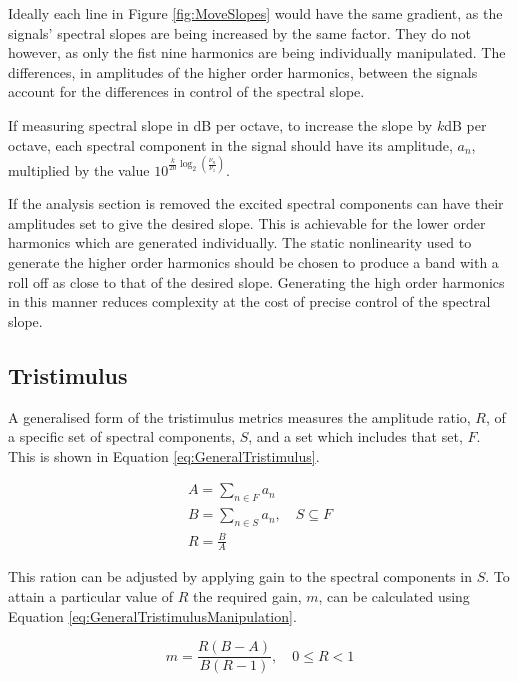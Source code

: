 		Ideally each line in Figure \ref{fig:MoveSlopes} would have the same gradient, as the signals' spectral
		slopes are being increased by the same factor. They do not however, as only the fist nine harmonics are
		being individually manipulated. The differences, in amplitudes of the higher order harmonics, between the
		signals account for the differences in control of the spectral slope.

		If measuring spectral slope in dB per octave, to increase the slope by $k$dB per octave, each spectral
		component in the signal should have its amplitude, $a_{n}$, multiplied by the value
		$10^{\frac{k}{20}\log_{2} \left( \frac{\nu_{n}}{\nu_{1}} \right)}$.

		If the analysis section is removed the excited spectral components can have their amplitudes set to give
		the desired slope. This is achievable for the lower order harmonics which are generated individually.  The
		static nonlinearity used to generate the higher order harmonics should be chosen to produce a band with a
		roll off as close to that of the desired slope. Generating the high order harmonics in this manner reduces
		complexity at the cost of precise control of the spectral slope.

	\subsection{Tristimulus}
	\label{sec:FeatureControl-Parameterisation-Tristimulus}
		A generalised form of the tristimulus metrics measures the amplitude ratio, $R$, of a specific set of
		spectral components, $S$, and a set which includes that set, $F$. This is shown in Equation
		\ref{eq:GeneralTristimulus}.

		\begin{gather}
			A = \sum_{n \in F} a_{n} \nonumber \\
			B = \sum_{n \in S} a_{n}, \quad S \subseteq F \nonumber \\
			R = \frac{B}{A}
			\label{eq:GeneralTristimulus}
		\end{gather}

		This ration can be adjusted by applying gain to the spectral components in $S$. To attain a particular
		value of $R$ the required gain, $m$, can be calculated using Equation
		\ref{eq:GeneralTristimulusManipulation}.

		\begin{equation}
			m = \frac{R(B - A)}{B(R - 1)}, \quad 0 \leq R < 1
			\label{eq:GeneralTristimulusManipulation}
		\end{equation}

